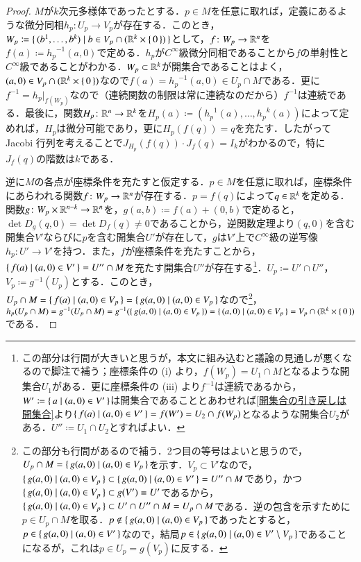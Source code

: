 \begin{proof}
$M$が$k$次元多様体であったとする．$p \in M$を任意に取れば，定義にあるような微分同相$h_p \colon U_p \to V_p$が存在する．このとき，$W_p \coloneqq \set{(b^1, \dots, b^k) | b \in V_p \cap (\mathbb{R}^k \times \set{0})}$として，$f \colon W_p \to \mathbb{R}^n$を$f(a) \coloneqq {h_p}^{-1}(a,0)$で定める．$h_p$が$C^\infty$級微分同相であることから$f$の単射性と$C^\infty$級であることがわかる．$W_p \subset \mathbb{R}^k$が開集合であることはよく，$(a,0) \in V_p \cap (\mathbb{R}^k \times \set{0})$なので$f(a) = {h_p}^{-1}(a,0) \in U_p \cap M$である．更に$f^{-1} = h_p|_{f(W_p)}$なので（連続関数の制限は常に連続なのだから）$f^{-1}$は連続である．最後に，関数$H_p \colon \mathbb{R}^n \to \mathbb{R}^k$を$H_p(a) \coloneqq ({h_p}^1(a), \dots, {h_p}^k(a))$によって定めれば，$H_p$は微分可能であり，更に$H_p(f(q))=q$を充たす．したがって Jacobi 行列を考えることで$J_{H_p}(f(q)) \cdot J_f(q) = I_k$がわかるので，特に$J_f(q)$の階数は$k$である．

逆に$M$の各点が座標条件を充たすと仮定する．$p \in M$を任意に取れば，座標条件にあらわれる関数$f \colon W_p \to \mathbb{R}^n$が存在する．$p = f(q)$によって$q \in \mathbb{R}^k$を定める．関数$g \colon W_p \times \mathbb{R}^{n-k} \to \mathbb{R}^n$を，$g(a,b) \coloneqq f(a) + (0,b)$で定めると，$\det D_g(q,0) = \det D_f(q) \neq 0$であることから，逆関数定理より$(q,0)$を含む開集合$V'$ならびに$p$を含む開集合$U'$が存在して，$g$は$V'$上で$C^\infty$級の逆写像$h_p \colon U' \to V'$を持つ．また，$f$が座標条件を充たすことから，$\set{f(a) | (a,0) \in V' } = U'' \cap M$を充たす開集合$U''$が存在する\footnote{この部分は行間が大きいと思うが，本文に組み込むと議論の見通しが悪くなるので脚注で補う；座標条件の (i) より，$f(W_p) = U_1 \cap M$となるような開集合$U_1$がある．更に座標条件の (iii) より$f^{-1}$は連続であるから，$W' \coloneqq \set{ a | (a,0) \in V'}$は開集合であることとあわせれば\cref{開集合の引き戻しは開集合}より$\set{f(a) | (a,0) \in V' } = f(W') = U_2 \cap f(W_p)$となるような開集合$U_2$がある．$U'' \coloneqq U_1 \cap U_2$とすればよい．}．$U_p \coloneqq U' \cap U''$，$V_p \coloneqq g^{-1}(U_p)$とする．このとき，$U_p \cap M = \set{ f(a) | (a,0) \in V_p} = \set{ g(a,0) | (a,0) \in V_p}$なので\footnote{この部分も行間があるので補う．2つ目の等号はよいと思うので，$U_p \cap M = \set{ g(a,0) | (a,0) \in V_p}$を示す．$V_p \subset V'$なので，$ \set{ g(a,0) | (a,0) \in V_p} \subset  \set{ g(a,0) | (a,0) \in V'} = U'' \cap M$であり，かつ$\set{ g(a,0) | (a,0) \in V_p} \subset g(V') = U'$であるから，$\set{ g(a,0) | (a,0) \in V_p} \subset U' \cap U'' \cap M = U_p \cap M$である．逆の包含を示すために$p \in U_p \cap M$を取る．$p \notin \set{ g(a,0) | (a,0) \in V_p}$であったとすると，$p \in \set{ g(a,0) | (a,0) \in V'}$なので，結局$p \in \set{ g(a,0) | (a,0) \in V' \setminus V_p}$であることになるが，これは$p \in U_p = g(V_p)$に反する．}，$h_p(U_p \cap M) = g^{-1}(U_p \cap M) = g^{-1}(\set{g(a,0) | (a,0) \in V_p}) = \set{(a,0) | (a,0) \in V_p} = V_p \cap (\mathbb{R}^k \times \set{0})$である．
\end{proof}

